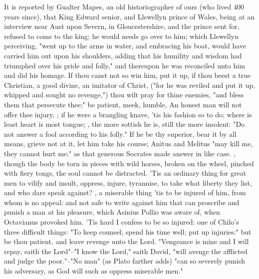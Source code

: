 {It is reported by Gualter Mapes, an old historiographer of ours (who lived 400 years since), that King Edward senior, and Llewellyn prince of Wales, being at an interview near Aust upon Severn, in Gloucestershire, and the prince sent for, refused to come to the king; he would needs go over to him; which Llewellyn perceiving, "went up to the arms in water, and embracing his boat, would have carried him out upon his shoulders, adding that his humility and wisdom had triumphed over his pride and folly," and thereupon he was reconciled unto him and did his homage. If thou canst not so win him, put it up, if thou beest a true Christian, a good divine, an imitator of Christ, ("for he was reviled and put it up, whipped and sought no revenge,") thou wilt pray for thine enemies, "and bless them that persecute thee;" be patient, meek, humble, \etc{} An honest man will not offer thee injury, ; if he were a brangling knave, 'tis his fashion so to do; where is least heart is most tongue; , the more sottish he is, still the more insolent: "Do not answer a fool according to his folly." If he be thy superior, bear it by all means, grieve not at it, let him take his course; Anitus and Melitus "may kill me, they cannot hurt me;" as that generous Socrates made answer in like case. , though the body be torn in pieces with wild horses, broken on the wheel, pinched with fiery tongs, the soul cannot be distracted. 'Tis an ordinary thing for great men to vilify and insult, oppress, injure, tyrannise, to take what liberty they list, and who dare speak against? , a miserable thing 'tis to be injured of him, from whom is no appeal: and not safe to write against him that can proscribe and punish a man at his pleasure, which Asinius Pollio was aware of, when Octavianus provoked him. 'Tis hard I confess to be so injured: one of Chilo's three difficult things: "To keep counsel; spend his time well; put up injuries:" but be thou patient, and leave revenge unto the Lord. "Vengeance is mine and I will repay, saith the Lord"--"I know the Lord," saith David, "will avenge the afflicted and judge the poor."--"No man" (as Plato farther adds) "can so severely punish his adversary, as God will such as oppress miserable men."

}
